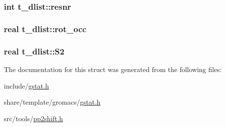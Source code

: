 \hypertarget{structt__dlist_a046dd4b7724277402afd9deccf054fa5}{
\subsubsection[{resnr}]{\setlength{\rightskip}{0pt plus 5cm}int {\bf t\-\_\-dlist\-::resnr}}}\label{structt__dlist_a046dd4b7724277402afd9deccf054fa5}
\hypertarget{structt__dlist_a6a7ed9f2f1950dce34d9a158e8f51006}{
\subsubsection[{rot\-\_\-occ}]{\setlength{\rightskip}{0pt plus 5cm}real {\bf t\-\_\-dlist\-::rot\-\_\-occ}}}\label{structt__dlist_a6a7ed9f2f1950dce34d9a158e8f51006}
\hypertarget{structt__dlist_aad62766378d4dd0781cd96609f3f9b8e}{
\subsubsection[{\-S2}]{\setlength{\rightskip}{0pt plus 5cm}real {\bf t\-\_\-dlist\-::\-S2}}}\label{structt__dlist_aad62766378d4dd0781cd96609f3f9b8e}


\-The documentation for this struct was generated from the following files\-:\begin{DoxyCompactItemize}
\item 
include/\hyperlink{include_2gstat_8h}{gstat.\-h}\item 
share/template/gromacs/\hyperlink{share_2template_2gromacs_2gstat_8h}{gstat.\-h}\item 
src/tools/\hyperlink{pp2shift_8h}{pp2shift.\-h}\end{DoxyCompactItemize}
